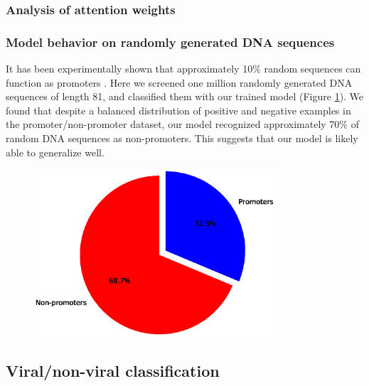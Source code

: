 \documentclass{article}
\begin{document}
\subsubsection{Analysis of attention weights}



\subsubsection{Model behavior on randomly generated DNA sequences}
It has been experimentally shown that approximately 10\% random sequences can function as promoters \cite{denovo_promoters}. Here we screened one million randomly generated DNA sequences of length 81, and classified them with our trained model (Figure \ref{fig:random}). We found that despite a balanced distribution of positive and negative examples in the promoter/non-promoter dataset, our model recognized approximately 70\% of random DNA sequences as non-promoters. This suggests that our model is likely able to generalize well.  


\begin{figure}[H]
\center
\includegraphics[width=0.8\textwidth]{massive_screening.eps}
%
\caption{}
\label{fig:random}
\end{figure}


\subsection{Viral/non-viral classification}
\end{document}
